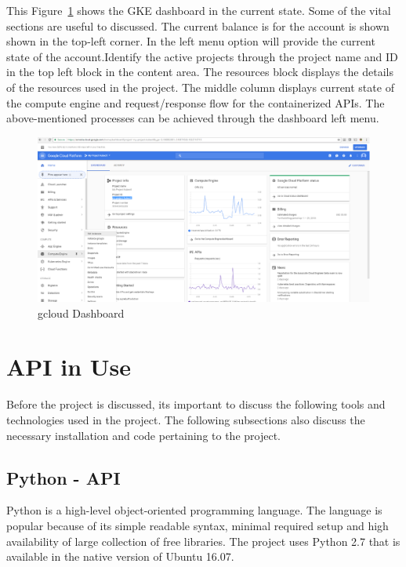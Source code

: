 This Figure~\ref{fig:gcloud-dashboard} shows the GKE dashboard in the current
state. Some of the vital sections are useful to discussed. The current balance
is for the account is shown shown in the top-left corner. In the left menu
option will provide the current state of the account.Identify the active
projects through the project name and ID in the top left block in the content
area. The resources block displays the details of the resources used in the
project. The middle column displays current state of the compute engine and
request/response flow for the containerized APIs.  The above-mentioned
processes can be achieved through the dashboard left menu.



\begin{figure}[htb]
 \centering\includegraphics[width=\columnwidth]{images/hid_417_gcloud_browser.png}
 \caption{gcloud Dashboard}\label{fig:gcloud-dashboard}
\end{figure}

 
\section{API in Use}

Before the project is discussed, its important to discuss the following tools
and technologies used in the project. The following subsections also discuss
the necessary installation and code pertaining to the project.


\subsection{Python - API}
Python is a high-level object-oriented programming language. The language is
popular because of its simple readable syntax, minimal required setup and high
availability of large collection of free libraries. The project uses Python
2.7 that is available in the native version of Ubuntu 16.07.

